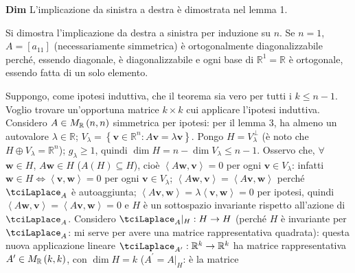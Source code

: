 \documentclass{article}
\begin{document}
\textbf{Dim} L'implicazione da sinistra a destra \`{e} dimostrata nel lemma
1.

Si dimostra l'implicazione da destra a sinistra per induzione su $n$. Se $%
n=1 $, $A=\left[ a_{11}\right] $ (necessariamente simmetrica) \`{e}
ortogonalmente diagonalizzabile perch\'{e}, essendo diagonale, \`{e}
diagonalizzabile e ogni base di $%
\mathbb{R}
^{1}=%
\mathbb{R}
$ \`{e} ortogonale, essendo fatta di un solo elemento.

Suppongo, come ipotesi induttiva, che il teorema sia vero per tutti i $k\leq
n-1$. Voglio trovare un'opportuna matrice $k\times k$ cui applicare
l'ipotesi induttiva. Considero $A\in M_{%
\mathbb{R}
}\left( n,n\right) $ simmetrica per ipotesi: per il lemma 3, ha almeno un
autovalore $\lambda \in 
\mathbb{R}
$; $V_{\lambda }=\left\{ \mathbf{v}\in 
\mathbb{R}
^{n}:A\mathbf{v}=\lambda \mathbf{v}\right\} $. Pongo $H=V_{\lambda }^{\perp
} $ (\`{e} noto che $H\oplus V_{\lambda }=%
\mathbb{R}
^{n}$); $g_{\lambda }\geq 1$, quindi $\dim H=n-\dim V_{\lambda }\leq n-1$.
Osservo che, $\forall $ $\mathbf{w}\in H$, $A\mathbf{w}\in H$ ($A\left(
H\right) \subseteq H$), cio\`{e} $\left\langle A\mathbf{w,v}\right\rangle =0$
per ogni $\mathbf{v}\in V_{\lambda }$: infatti $\mathbf{w}\in
H\Longleftrightarrow \left\langle \mathbf{v,w}\right\rangle =0$ per ogni $%
\mathbf{v}\in V_{\lambda }$; $\left\langle A\mathbf{w,v}\right\rangle
=\left\langle A\mathbf{v,w}\right\rangle $ perch\'{e} $\tciLaplace _{A}$ 
\`{e} autoaggiunta; $\left\langle A\mathbf{v,w}\right\rangle =\lambda
\left\langle \mathbf{v,w}\right\rangle =0$ per ipotesi, quindi $\left\langle
A\mathbf{w,v}\right\rangle =\left\langle A\mathbf{v,w}\right\rangle =0$ e $H$
\`{e} un sottospazio invariante rispetto all'azione di $\tciLaplace _{A}$.
Considero $\tciLaplace _{A}|_{H}:H\rightarrow H$ (perch\'{e} $H$ \`{e}
invariante per $\tciLaplace _{A}$: mi serve per avere una matrice
rappresentativa quadrata): questa nuova applicazione lineare $\tciLaplace
_{A^{\prime }}:%
\mathbb{R}
^{k}\rightarrow 
\mathbb{R}
^{k}$ ha matrice rappresentativa $A^{\prime }\in M_{%
\mathbb{R}
}\left( k,k\right) $, con $\dim H=k$ ($A^{\prime }=A|_{H}$: \`{e} la matrice
\end{document}

